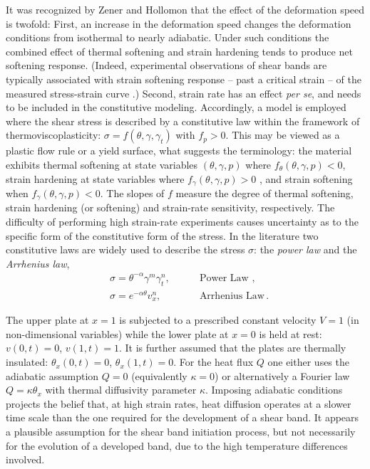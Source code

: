 \documentclass[a4paper,11pt]{article}
\newcommand{\tht}{\theta}
\newcommand{\ga}{\alpha}
\theoremstyle{remark}
\begin{document}
It was recognized by Zener and Hollomon \cite{ZH} that the effect of the deformation speed is twofold: 
First, an increase in the deformation speed changes the deformation conditions from isothermal 
to nearly adiabatic. Under such conditions the combined effect of thermal softening and strain hardening 
tends to produce net softening response. (Indeed, experimental observations of shear bands 
are  typically associated  with strain softening response -- past a critical strain -- 
of the measured stress-strain curve \cite{CDHS}.)
Second, strain rate has an effect {\it per se}, and needs to be included in the constitutive modeling.
Accordingly, a model is employed where  the shear stress is described by a constitutive law 
within the framework  of thermoviscoplasticity: $\sigma = f(\theta, \gamma, \gamma_t)$ with $f_p > 0$.
This may be viewed as a plastic flow rule or a yield surface, what suggests the terminology: 
the material exhibits thermal softening at state variables $(\theta, \gamma, p)$ 
where $f_\theta(\theta, \gamma, p) < 0$, strain hardening at state variables where $f_\gamma(\theta, \gamma, p) > 0$ , and strain softening when $f_\gamma(\theta, \gamma, p) < 0$. 
The slopes of $f$ measure the degree of thermal softening, strain hardening (or softening) 
and strain-rate sensitivity, respectively. 
The difficulty of performing high strain-rate experiments causes uncertainty as to the specific form of the constitutive form of the stress.  In the literature two constitutive 
laws are widely used to describe the stress $\sigma$:
 the \emph{power law} and the \emph{Arrhenius law},
\begin{align}
&  \sigma =  \theta^{-\alpha} \gamma^{m} \gamma_{t}^{n}, \quad & &  \text{ Power Law }, \label{PL0}\\
& \sigma = e^{-\ga\tht} v_x^n, \quad & & \text{ Arrhenius Law} \label{ARL0}  \, .
\end{align}


The upper plate at $x=1$ is subjected to a prescribed constant velocity $V=1$  (in non-dimensional variables) while the lower plate at $x=0$ is held at rest: $v(0,t) = 0$,  $v(1,t) = 1$.
It is further assumed that the plates are thermally insulated:  $ \theta_{x}(0,t) = 0$,  $\theta_{x}(1,t) = 0$.
For the heat flux $Q$ one either uses the adiabatic assumption $Q = 0$ (equivalently $\kappa = 0$)
or alternatively a Fourier  law $Q = \kappa \theta_{x}$ with thermal diffusivity
parameter $\kappa$.
Imposing adiabatic conditions projects the belief that, at high strain rates,
heat diffusion operates at a slower time scale than the one required for the development 
of a shear band. It appears a plausible assumption for the shear band initiation process, 
but not necessarily for the evolution of a developed band,
 due to the high temperature differences involved.
 
\end{document}
